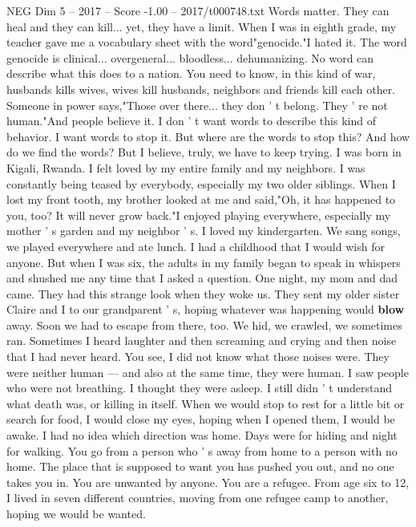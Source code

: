\begin{textsample}{NEG Dim 5 – 2017 – Score -1.00 – 2017/t000748.txt}  \label{ex:f5_neg_023}
Words matter.
They can heal and they can kill... yet, they have a limit.
When I was in eighth grade, my teacher gave me a vocabulary sheet with the word"genocide."I hated it.
The word genocide is clinical... overgeneral... bloodless... dehumanizing.
No word can describe what this does to a nation.
You need to know, in this kind of war, husbands kills wives, wives kill husbands, neighbors and friends kill each other.
Someone in power says,"Those over there... they don ' t belong.
They ' re not human."And people believe it.
I don ' t want words to describe this kind of behavior.
I want words to stop it.
But where are the words to stop this?
And how do we find the words?
But I believe, truly, we have to keep trying.
I was born in Kigali, Rwanda.
I felt loved by my entire family and my neighbors.
I was constantly being teased by everybody, especially my two older siblings.
When I lost my front tooth, my brother looked at me and said,"Oh, it has happened to you, too?
It will never grow back."I enjoyed playing everywhere, especially my mother ' s garden and my neighbor ' s.
I loved my kindergarten.
We sang songs, we played everywhere and ate lunch.
I had a childhood that I would wish for anyone.
But when I was six, the adults in my family began to speak in whispers and shushed me any time that I asked a question.
One night, my mom and dad came.
They had this strange look when they woke us.
They sent my older sister Claire and I to our grandparent ' s, hoping whatever was happening would \textbf{blow} away.
Soon we had to escape from there, too.
We hid, we crawled, we sometimes ran.
Sometimes I heard laughter and then screaming and crying and then noise that I had never heard.
You see, I did not know what those noises were.
They were neither human — and also at the same time, they were human.
I saw people who were not breathing.
I thought they were asleep.
I still didn ' t understand what death was, or killing in itself.
When we would stop to rest for a little bit or search for food, I would close my eyes, hoping when I opened them, I would be awake.
I had no idea which direction was home.
Days were for hiding and night for walking.
You go from a person who ' s away from home to a person with no home.
The place that is supposed to want you has pushed you out, and no one takes you in.
You are unwanted by anyone.
You are a refugee.
From age six to 12, I lived in seven different countries, moving from one refugee camp to another, hoping we would be wanted.

\end{textsample}
